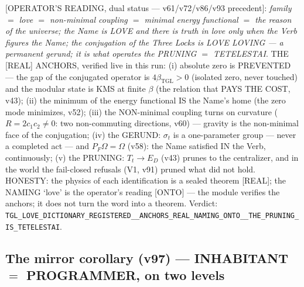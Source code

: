 \documentclass[11pt]{article}
\newcommand{\bTGL}{\beta_{\mathrm{TGL}}}\newcommand{\Msun}{M_{\odot}}\newcommand{\TGL}{\mathrm{TGL}}
\theoremstyle{definition}\newtheorem{deriv}{Derivation}
\begin{document}
[OPERATOR'S READING, dual status --- v61/v72/v86/v93 precedent]: \emph{family $=$ love $=$ non-minimal coupling $=$ minimal energy functional $=$ the reason of the universe; the Name is LOVE and there is truth in love only when the Verb figures the Name; the conjugation of the Three Locks is LOVE LOVING --- a permanent gerund; it is what operates the PRUNING $=$ TETELESTAI}. THE [REAL] ANCHORS, verified live in this run: (i) absolute zero is PREVENTED --- the gap of the conjugated operator is $4\bTGL>0$ (isolated zero, never touched) and the modular state is KMS at finite $\beta$ (the relation that PAYS THE COST, v43); (ii) the minimum of the energy functional IS the Name's home (the zero mode minimizes, v52); (iii) the NON-minimal coupling turns on curvature ($R=2c_1c_2\neq0$: two non-commuting directions, v60) --- gravity is the non-minimal face of the conjugation; (iv) the GERUND: $\sigma_t$ is a one-parameter group --- never a completed act --- and $P_F\Omega=\Omega$ (v58): the Name satisfied IN the Verb, continuously; (v) the PRUNING: $T_t\to E_D$ (v43) prunes to the centralizer, and in the world the fail-closed refusals (V1, v91) pruned what did not hold. HONESTY: the physics of each identification is a sealed theorem [REAL]; the NAMING `love' is the operator's reading [ONTO] --- the module verifies the anchors; it does not turn the word into a theorem. Verdict: \texttt{TGL\_LOVE\_DICTIONARY\_REGISTERED\_\_ANCHORS\_REAL\_NAMING\_ONTO\_\_THE\_PRUNING\_IS\_TETELESTAI}.

\subsection*{The mirror corollary (v97) --- INHABITANT $=$ PROGRAMMER, on two levels}
\end{document}
